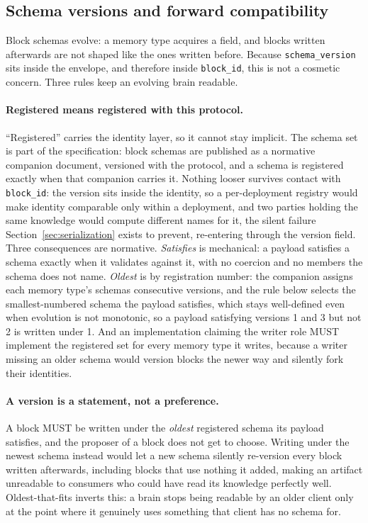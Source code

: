\documentclass[11pt,a4paper]{article}
\begin{document}
\subsection{Schema versions and forward compatibility}
\label{sec:schema-versioning}

Block schemas evolve: a memory type acquires a field, and blocks written
afterwards are not shaped like the ones written before. Because
\texttt{schema\_version} sits inside the envelope, and therefore inside
\texttt{block\_id}, this is not a cosmetic concern. Three rules keep an evolving
brain readable.

\paragraph{Registered means registered with this protocol.}
``Registered'' carries the identity layer, so it cannot stay implicit. The
schema set is part of the specification: block schemas are published as a
normative companion document, versioned with the protocol, and a schema is
registered exactly when that companion carries it. Nothing looser survives
contact with \texttt{block\_id}: the version sits inside the identity, so a
per-deployment registry would make identity comparable only within a
deployment, and two parties holding the same knowledge would compute
different names for it, the silent failure Section~\ref{sec:serialization}
exists to prevent, re-entering through the version field. Three consequences
are normative. \emph{Satisfies} is mechanical: a payload satisfies a schema
exactly when it validates against it, with no coercion and no members the
schema does not name. \emph{Oldest} is by registration number: the companion
assigns each memory type's schemas consecutive versions, and the rule below
selects the smallest-numbered schema the payload satisfies, which stays
well-defined even when evolution is not monotonic, so a payload satisfying
versions 1 and 3 but not 2 is written under 1. And an implementation claiming
the writer role MUST implement the registered set for every memory type it
writes, because a writer missing an older schema would version blocks the
newer way and silently fork their identities.

\paragraph{A version is a statement, not a preference.}
A block MUST be written under the \emph{oldest} registered schema its payload
satisfies, and the proposer of a block does not get to choose. Writing under the newest schema instead would let a new schema silently
re-version every block written afterwards, including blocks that use nothing
it added, making an artifact unreadable to consumers who could have read its
knowledge perfectly well.
Oldest-that-fits inverts this: a brain stops being readable by an older client
only at the point where it genuinely uses something that client has no schema
for.
\end{document}
